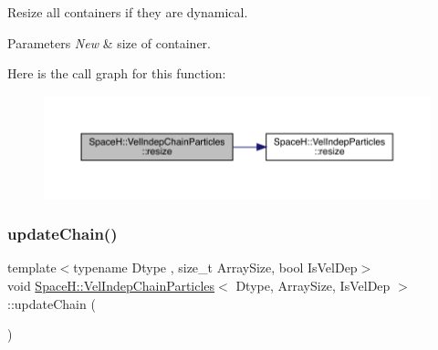 Resize all containers if they are dynamical. 


\begin{DoxyParams}{Parameters}
{\em New} & size of container. \\
\hline
\end{DoxyParams}
Here is the call graph for this function\+:
\nopagebreak
\begin{figure}[H]
\begin{center}
\leavevmode
\includegraphics[width=350pt]{class_space_h_1_1_vel_indep_chain_particles_afdf6136619e4be707bed1e9859bc7171_cgraph}
\end{center}
\end{figure}
\mbox{\label{class_space_h_1_1_vel_indep_chain_particles_a06d1ed1c4eaef6229aabf5ad3f2de45d}} 
\subsubsection{\texorpdfstring{update\+Chain()}{updateChain()}\hspace{0.1cm}{\footnotesize\ttfamily [1/2]}}
{\footnotesize\ttfamily template$<$typename Dtype , size\+\_\+t Array\+Size, bool Is\+Vel\+Dep$>$ \\
void \mbox{\hyperlink{class_space_h_1_1_vel_indep_chain_particles}{Space\+H\+::\+Vel\+Indep\+Chain\+Particles}}$<$ Dtype, Array\+Size, Is\+Vel\+Dep $>$\+::update\+Chain (\begin{DoxyParamCaption}{ }\end{DoxyParamCaption})\hspace{0.3cm}{\ttfamily [inline]}}


